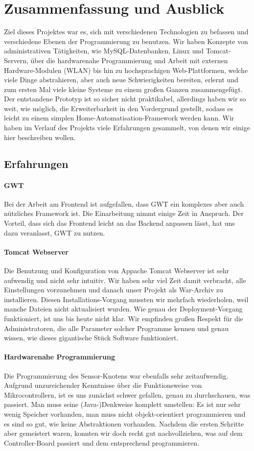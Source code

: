 \documentclass[12pt,a4paper,twoside]{article}
\newcommand{\labelSec}[1]{\label{sec:#1}}
\begin{document}
\section{Zusammenfassung und Ausblick} \labelSec{ausblick}
Ziel dieses Projektes war es, sich mit verschiedenen Technologien zu befassen und verschiedene Ebenen der Programmierung zu benutzen. Wir haben Konzepte von administrativen Tätigkeiten, wie MySQL-Datenbanken, Linux und Tomcat-Servern, über die hardwarenahe Programmierung und Arbeit mit externen Hardware-Modulen (WLAN) bis hin zu hochsprachigen Web-Plattformen, welche viele Dinge abstrahieren, aber auch neue Schwierigkeiten bereiten, erlernt und zum ersten Mal viele kleine Systeme zu einem großen Ganzen zusammengefügt. Der entstandene Prototyp ist so sicher nicht praktikabel, allerdings haben wir so weit, wie möglich, die Erweiterbarkeit in den Vordergrund gestellt, sodass es leicht zu einem simplen Home-Automatisation-Framework werden kann. Wir haben im Verlauf des Projekts viele Erfahrungen gesammelt, von denen wir einige hier beschreiben wollen.
\subsection{Erfahrungen}
\paragraph{GWT}
Bei der Arbeit am Frontend ist aufgefallen, dass GWT ein komplexes aber auch nützliches Framework ist. Die Einarbeitung nimmt einige Zeit in Anspruch. Der Vorteil, dass sich das Frontend leicht an das Backend anpassen lässt, hat uns dazu veranlasst, GWT zu nutzen.

\paragraph{Tomcat Webserver}
Die Benutzung und Konfiguration von Appache Tomcat Webserver ist sehr aufwendig und nicht sehr intuitiv. Wir haben sehr viel Zeit damit verbracht, alle Einstellungen vorzunehmen und danach unser Projekt als War-Archiv zu installieren. Diesen Installations-Vorgang mussten wir mehrfach wiederholen, weil manche Dateien nicht aktualisiert wurden. Wie genau der Deployment-Vorgang funktioniert, ist uns bis heute nicht klar. Wir empfinden großen Respekt für die Administratoren, die alle Parameter solcher Programme kennen und genau wissen, wie dieses gigantische Stück Software funktioniert. 

\paragraph{Hardwarenahe Programmierung}
Die Programmierung des Sensor-Knotens war ebenfalls sehr zeitaufwendig. Aufgrund unzureichender Kenntnisse über die Funktionsweise von Mikrocontrollern, ist es uns zunächst schwer gefallen, genau zu durchschauen, was passiert. Man muss seine (Java-)Denkweise komplett umstellen: Es ist nur sehr wenig Speicher vorhanden, man muss nicht objekt-orientiert programmieren und es sind so gut, wie keine Abstraktionen vorhanden. Nachdem die ersten Schritte aber gemeistert waren, konnten wir doch recht gut nachvollziehen, was auf dem Controller-Board passiert und dem entsprechend programmieren.
\end{document}
